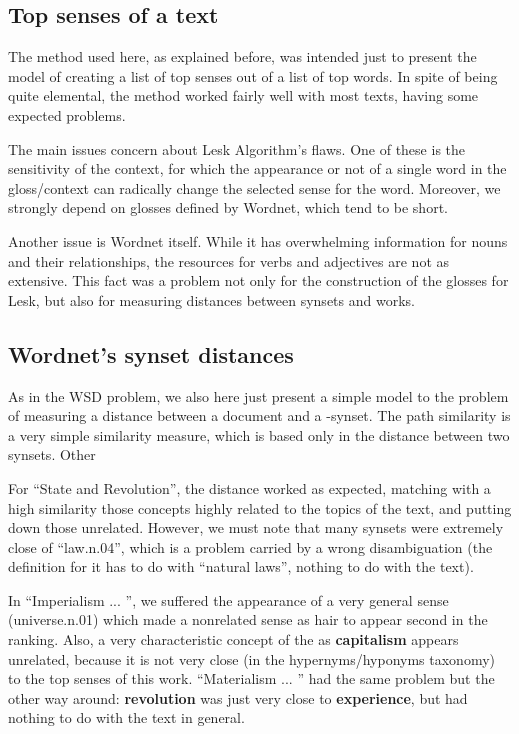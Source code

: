 \documentclass{pnastwo}
\begin{document}
\begin{article}
\subsection{Top senses of a text}
The method used here, as explained before, was intended just to present the model of creating a list of top senses out of a list of top words. In spite of being quite elemental, the method worked fairly well with most texts, having some expected problems.

The main issues concern about Lesk Algorithm's flaws. One of these is the sensitivity of the context, for which the appearance or not of a single word in the gloss/context can radically change the selected sense for the word. Moreover, we strongly depend on glosses defined by Wordnet, which tend to be short.

Another issue is Wordnet itself. While it has overwhelming information for nouns and their relationships, the resources for verbs and adjectives are not as extensive. This fact was a problem not only for the construction of the glosses for Lesk, but also for measuring distances between synsets and works.

\subsection{Wordnet's synset distances}

As in the WSD problem, we also here just present a simple model to the problem of measuring a distance between a document and a -synset. The path similarity is a very simple similarity measure, which is based only in the distance between two synsets. Other 

For ``State and Revolution'', the distance worked as expected, matching with a high similarity those concepts highly related to the topics of the text, and putting down those unrelated. However, we must note that many synsets were extremely close of ``law.n.04'', which is a problem carried by a wrong disambiguation (the definition for it has to do with ``natural laws'', nothing to do with the text).

In ``Imperialism ... '', we suffered the appearance of a very general sense (universe.n.01) which made a nonrelated sense as hair to appear second in the ranking. Also, a very characteristic concept of the  as \textbf{capitalism} appears unrelated, because it is not very close (in the hypernyms/hyponyms taxonomy) to the top senses of this work. ``Materialism ... '' had the same problem but the other way around: \textbf{revolution} was just very close to \textbf{experience}, but had nothing to do with the text in general.


\end{article}
\end{document}
